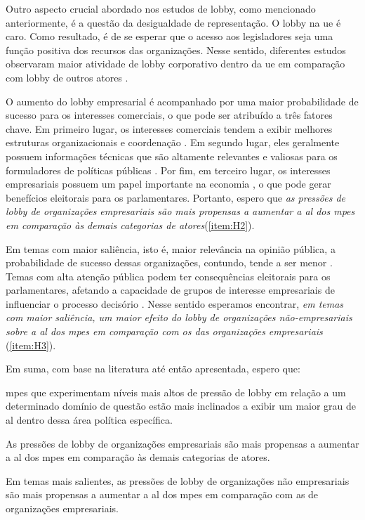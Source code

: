 Outro aspecto crucial abordado nos estudos de lobby, como mencionado anteriormente, é a questão da desigualdade de representação. O lobby na \acrshort{ue} é caro. Como resultado, é de se esperar que o acesso aos legisladores seja uma função positiva dos recursos das organizações. Nesse sentido, diferentes estudos observaram maior atividade de lobby corporativo dentro da \acrshort{ue} em comparação com lobby de outros atores \cite{Bouwen2002, Poletti2016, Berkhout2018, Hanegraaff2021}.

O aumento do lobby empresarial é acompanhado por uma maior probabilidade de sucesso para os interesses comerciais, o que pode ser atribuído a três fatores chave. Em primeiro lugar, os interesses comerciais tendem a exibir melhores estruturas organizacionais e coordenação \cite{olson1971logic}. Em segundo lugar, eles geralmente possuem informações técnicas que são altamente relevantes e valiosas para os formuladores de políticas públicas \cite{kerwin2018rulemaking}. Por fim, em terceiro lugar, os interesses empresariais possuem um papel importante na economia \cite{lindblom1980politics}, o que pode gerar benefícios eleitorais para os parlamentares. Portanto, espero que \emph{as pressões de lobby de organizações empresariais são mais propensas a aumentar a \acrshort{al} dos \acrshort{mpe}s em comparação às demais categorias de atores}(\ref{item:H2}).

Em temas com maior saliência, isto é, maior relevância na opinião pública, a probabilidade de sucesso dessas organizações, contundo, tende a ser menor \cite{caldeira2000lobbying, baumgartner2010agendas, bonardi2005corporate, mahoney_lobbying_2007}. Temas com alta atenção pública podem ter consequências eleitorais para os parlamentares, afetando a capacidade de grupos de interesse empresariais de influenciar o processo decisório \cite{mahoney_lobbying_2007, mahoney2008brussels}. Nesse sentido esperamos encontrar, \emph{em temas com maior saliência, um maior efeito do lobby de organizações não-empresariais sobre a \acrshort{al} dos \acrshort{mpe}s em comparação com os das organizações empresariais} (\ref{item:H3}).

Em suma, com base na literatura até então apresentada, espero que:
\begin{hypotheses}
    \item \label{item:H1} \acrshort{mpe}s que experimentam níveis mais altos de pressão de lobby em relação a um determinado domínio de questão estão mais inclinados a exibir um maior grau de \acrshort{al} dentro dessa área política específica.
    
    \item \label{item:H2} As pressões de lobby de organizações empresariais são mais propensas a aumentar a \acrshort{al} dos \acrshort{mpe}s em comparação às demais categorias de atores.
    
    \item \label{item:H3} Em temas mais salientes, as pressões de lobby de organizações não empresariais são mais propensas a aumentar a \acrshort{al} dos \acrshort{mpe}s em comparação com as de organizações empresariais.
\end{hypotheses}


